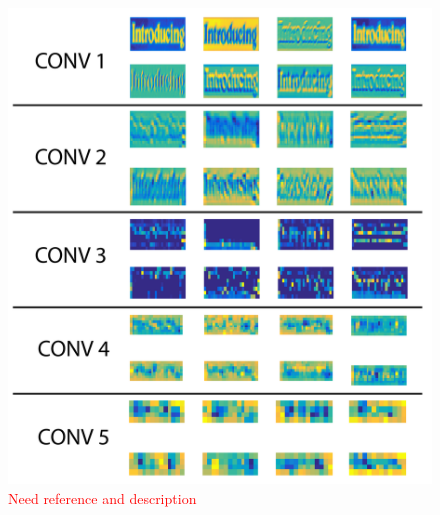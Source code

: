 \documentclass[10pt,twocolumn,letterpaper]{article}
\begin{document}
\begin{figure}
\includegraphics[width=\columnwidth]{Figures/activation_vis/activation_vis-01.png}
\caption{\textcolor{red}{Need reference and description}}
\label{fig:deepvis}
\end{figure}
\end{document}
